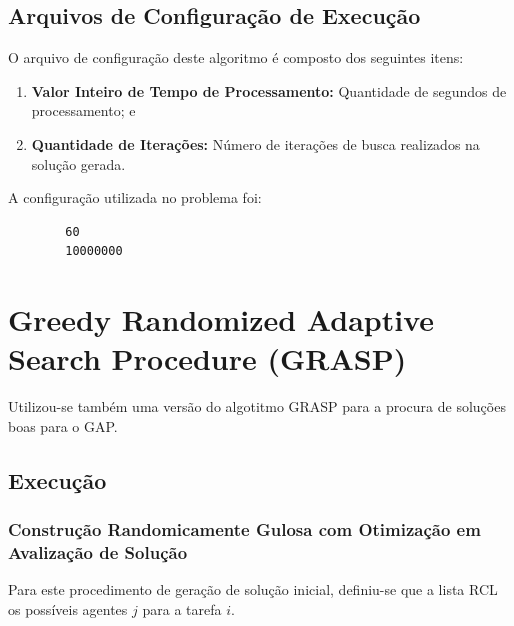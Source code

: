\documentclass[portugues, brazil, a4paper,12pt]{article}
\begin{document}
	
	\subsection{Arquivos de Configuração de Execução}
		O arquivo de configuração deste algoritmo é composto dos seguintes itens:
		
		\begin{enumerate}
			\item \textbf{Valor Inteiro de Tempo de Processamento:} Quantidade de segundos de processamento; e
			
			\item \textbf{Quantidade de Iterações:} Número de iterações de busca realizados na solução gerada.
		\end{enumerate}
		
		A configuração utilizada no problema foi:
		
		\begin{verbatim}
		60
		10000000
		\end{verbatim}
	



\section{Greedy Randomized Adaptive Search Procedure (GRASP)}
	Utilizou-se também uma versão do algotitmo GRASP para a procura de soluções boas para o GAP.
	
	\subsection{Execução}
	
		\subsubsection{Construção Randomicamente Gulosa com Otimização em Avalização de Solução}
			Para este procedimento de geração de solução inicial, definiu-se que a lista RCL os possíveis agentes $j$ para a tarefa $i$.
\end{document}
